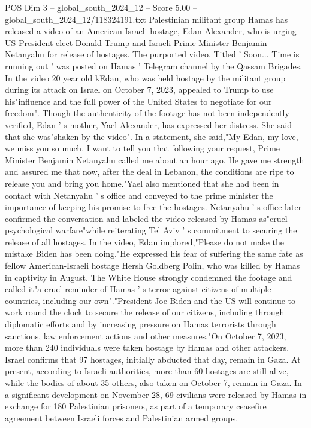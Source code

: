 \begin{textsample}{POS Dim 3 – global\_south\_2024\_12 – Score 5.00 – global\_south\_2024\_12/118324191.txt}  \label{ex:f3_pos_398}
Palestinian militant group Hamas has released a video of an American-Israeli hostage, Edan Alexander, who is urging US President-elect Donald Trump and Israeli Prime Minister Benjamin Netanyahu for release of hostages.
The purported video, Titled ' Soon...
Time is running out ' was posted on Hamas ' Telegram channel by the Qassam Brigades.
In the video 20 year old kEdan, who was held hostage by the militant group during its attack on Israel on October 7, 2023, appealed to Trump to use his"influence and the full power of the United States to negotiate for our freedom".
Though the authenticity of the footage has not been independently verified, Edan ' s mother, Yael Alexander, has expressed her distress.
She said that she was"shaken by the video".
In a statement, she said,"My Edan, my love, we miss you so much.
I want to tell you that following your request, Prime Minister Benjamin Netanyahu called me about an hour ago.
He gave me strength and assured me that now, after the deal in Lebanon, the conditions are ripe to release you and bring you home."Yael also mentioned that she had been in contact with Netanyahu ' s office and conveyed to the prime minister the importance of keeping his promise to free the hostages.
Netanyahu ' s office later confirmed the conversation and labeled the video released by Hamas as"cruel psychological warfare"while reiterating Tel Aviv ' s commitment to securing the release of all hostages.
In the video, Edan implored,"Please do not make the mistake Biden has been doing."He expressed his fear of suffering the same fate as fellow American-Israeli hostage Hersh Goldberg Polin, who was killed by Hamas in captivity in August.
The White House strongly condemned the footage and called it"a cruel reminder of Hamas ' s terror against citizens of multiple countries, including our own"."President Joe Biden and the US will continue to work round the clock to secure the release of our citizens, including through diplomatic efforts and by increasing pressure on Hamas terrorists through sanctions, law enforcement actions and other measures."On October 7, 2023, more than 240 individuals were taken hostage by Hamas and other attackers.
Israel confirms that 97 hostages, initially abducted that day, remain in Gaza.
At present, according to Israeli authorities, more than 60 hostages are still alive, while the bodies of about 35 others, also taken on October 7, remain in Gaza.
In a significant development on November 28, 69 civilians were released by Hamas in exchange for 180 Palestinian prisoners, as part of a temporary ceasefire agreement between Israeli forces and Palestinian armed groups.

\end{textsample}
